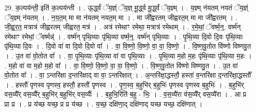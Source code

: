 \documentclass[17pt]{extarticle}
\begin{document}
29. क॒ल्पय॑न्ती॒ इति॑ क॒ल्पय॑न्ती । . ऊ॒र्द्ध्वं ॅय॒ज्ञ्ं ॅय॒ज्ञ् मू॒र्द्ध्व मू॒र्द्ध्वं ॅय॒ज्ञ्म् । . य॒ज्ञ्म् न॑यतम् नयतं ॅय॒ज्ञ्ं ॅय॒ज्ञ्म् न॑यतम् । . न॒य॒त॒म् मा मा न॑यतम् नयत॒म् मा । . मा जी᳚ह्वरतम् जीह्वरत॒म् मा मा जी᳚ह्वरतम् । . जी॒ह्व॒र॒त॒ मत्रात्र॑ जीह्वरतम् जीह्वरत॒ मत्र॑ । . अत्र॑ रमेथाꣳ रमेथा॒ मत्रात्र॑ रमेथाम् । . र॒मे॒थां॒ ॅवर्ष्म॒न्॒. वर्ष्म॑न् रमेथाꣳ रमेथां॒ ॅवर्ष्मन्न्॑ । . वर्ष्म॑न् पृथि॒व्याः पृ॑थि॒व्या वर्ष्म॒न्॒. वर्ष्म॑न् पृथि॒व्याः । . पृ॒थि॒व्या दि॒वो दि॒वः पृ॑थि॒व्याः पृ॑थि॒व्या दि॒वः । . दि॒वो वा॑ वा दि॒वो दि॒वो वा᳚ । . वा॒ वि॒ष्णो॒ वि॒ष्णो॒ वा॒ वा॒ वि॒ष्णो॒ । . वि॒ष्ण॒वु॒तोत वि॑ष्णो विष्णवु॒त । . उ॒त वा॑ वो॒तोत वा᳚ । . वा॒ पृ॒थि॒व्याः पृ॑थि॒व्या वा॑ वा पृथि॒व्याः । . पृ॒थि॒व्या म॒हो म॒हः पृ॑थि॒व्याः पृ॑थि॒व्या म॒हः । . म॒हो वा॑ वा म॒हो म॒हो वा᳚ । . वा॒ वि॒ष्णो॒ वि॒ष्णो॒ वा॒ वा॒ वि॒ष्णो॒ । . वि॒ष्ण॒वु॒तोत वि॑ष्णो विष्णवु॒त । . उ॒त वा॑ वो॒तोत वा᳚ । . वा॒ ऽन्तरि॑क्षा द॒न्तरि॑क्षाद् वा वा॒ ऽन्तरि॑क्षात् । . अ॒न्तरि॑क्षा॒द्धस्तौ॒ हस्ता॑ व॒न्तरि॑क्षा द॒न्तरि॑क्षा॒द्धस्तौ᳚ । . हस्तौ॑ पृणस्व पृणस्व॒ हस्तौ॒ हस्तौ॑ पृणस्व । . पृ॒ण॒स्व॒ ब॒हुभि॑र् ब॒हुभिः॑ पृणस्व पृणस्व ब॒हुभिः॑ । . ब॒हुभि॑र् वस॒व्यै᳚र् वस॒व्यै᳚र् ब॒हुभि॑र् ब॒हुभि॑र् वस॒व्यैः᳚ । . ब॒हुभि॒रिति॑ ब॒हु - भिः॒ । . व॒स॒व्यै॑रा व॑स॒व्यै᳚र् वस॒व्यै॑रा । . आ प्र प्रा प्र । . प्र य॑च्छ यच्छ॒ प्र प्र य॑च्छ । . य॒च्छ॒ दक्षि॑णा॒द् दक्षि॑णाद् यच्छ यच्छ॒ दक्षि॑णात् । \newline
\end{document}
